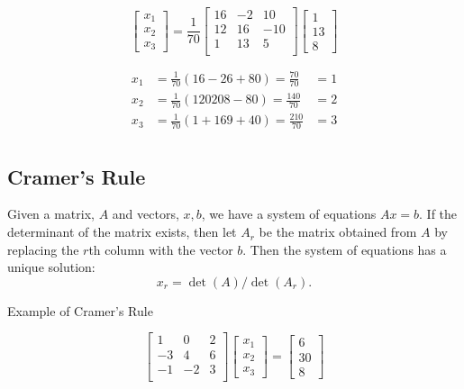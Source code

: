 \documentclass[
]{book}
\begin{document}
\[
\begin{bmatrix} x_1 \\ x_2 \\ x_3 \end{bmatrix} = \frac{1}{70}
\begin{bmatrix}
16 & -2 & 10 \\
12 & 16 & -10 \\
1 & 13 & 5 \\
\end{bmatrix}
\begin{bmatrix}
1 \\ 13 \\ 8
\end{bmatrix} 
\]

\begin{align}
x_1 &= \frac{1}{70} \left( 16 - 26 + 80 \right) = \frac{70}{70} &= 1 \\
x_2 &= \frac{1}{70} \left( 12 0 208 - 80 \right) = \frac{140}{70} &= 2 \\
x_3 &= \frac{1}{70} \left( 1 + 169 + 40 \right) = \frac{210}{70} &= 3 \\
\end{align}

\hypertarget{cramers-rule}{%
\subsection{Cramer's Rule}\label{cramers-rule}}

Given a matrix, \(A\) and vectors, \(x, b\), we have a system of equations \(A x = b\). If the determinant of the matrix exists, then let \(A_r\) be the matrix obtained from \(A\) by replacing the \(r\)th column with the vector \(b\). Then the system of equations has a unique solution:
\[x_r = \det(A)/ \det(A_r).\]

Example of Cramer's Rule

\[
\begin{bmatrix}
1 & 0 & 2\\
-3 & 4 & 6 \\
-1 & -2 & 3 \\
\end{bmatrix}
\begin{bmatrix}
x_1 \\ x_2 \\ x_3
\end{bmatrix}
=
\begin{bmatrix}
6 \\ 30 \\ 8
\end{bmatrix}
\]
\end{document}
